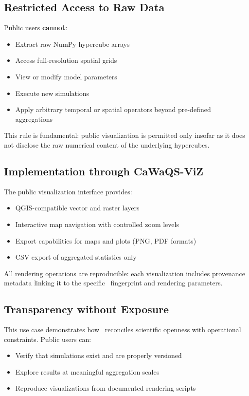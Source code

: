 \subsection{Restricted Access to Raw Data}

Public users \textbf{cannot}:

\begin{itemize}
\item Extract raw NumPy hypercube arrays
\item Access full-resolution spatial grids
\item View or modify model parameters
\item Execute new simulations
\item Apply arbitrary temporal or spatial operators beyond pre-defined aggregations
\end{itemize}

This rule is fundamental: public visualization is permitted only insofar as it does not disclose the raw numerical content of the underlying hypercubes.

\subsection{Implementation through CaWaQS-ViZ}

The public visualization interface provides:

\begin{itemize}
\item QGIS-compatible vector and raster layers
\item Interactive map navigation with controlled zoom levels
\item Export capabilities for maps and plots (PNG, PDF formats)
\item CSV export of aggregated statistics only
\end{itemize}

All rendering operations are reproducible: each visualization includes provenance metadata linking it to the specific \hydrot\ fingerprint and rendering parameters.

\subsection{Transparency without Exposure}

This use case demonstrates how \hydrot\ reconciles scientific openness with operational constraints. Public users can:

\begin{itemize}
\item Verify that simulations exist and are properly versioned
\item Explore results at meaningful aggregation scales
\item Reproduce visualizations from documented rendering scripts
\end{itemize}

